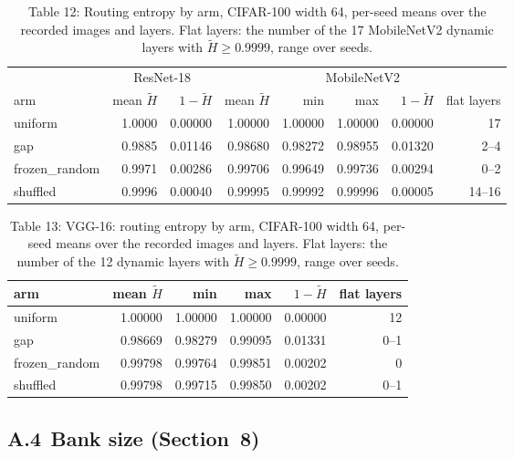 \documentclass{article}
\begin{document}
\begin{table}
\caption{Table 12: Routing entropy by arm, CIFAR-100 width 64, per-seed means over
the recorded images and layers. Flat layers: the number of the
17 MobileNetV2 dynamic layers with $\tilde H\ge0.9999$, range
over seeds.}

\begin{tabular}{l rr rrrr r}
\toprule
& \multicolumn{2}{c}{ResNet-18} & \multicolumn{5}{c}{MobileNetV2} \\

arm & mean $\tilde H$ & $1-\tilde H$ & mean $\tilde H$ & min & max & $1-\tilde H$ & flat layers \\
\midrule
uniform & 1.0000 & 0.00000 & 1.00000 & 1.00000 & 1.00000 & 0.00000 & 17 \\
gap & 0.9885 & 0.01146 & 0.98680 & 0.98272 & 0.98955 & 0.01320 & 2--4 \\
frozen\_random & 0.9971 & 0.00286 & 0.99706 & 0.99649 & 0.99736 & 0.00294 & 0--2 \\
shuffled & 0.9996 & 0.00040 & 0.99995 & 0.99992 & 0.99996 & 0.00005 & 14--16 \\
\bottomrule
\end{tabular}
\end{table}

\begin{table}
\caption{Table 13: VGG-16: routing entropy by arm, CIFAR-100 width 64, per-seed
means over the recorded images and layers. Flat layers: the number of the
12 dynamic layers with $\tilde H\ge0.9999$, range over seeds.}

\begin{tabular}{l rrrr r}
\toprule
arm & mean $\tilde H$ & min & max & $1-\tilde H$ & flat layers \\
\midrule
uniform & 1.00000 & 1.00000 & 1.00000 & 0.00000 & 12 \\
gap & 0.98669 & 0.98279 & 0.99095 & 0.01331 & 0--1 \\
frozen\_random & 0.99798 & 0.99764 & 0.99851 & 0.00202 & 0 \\
shuffled & 0.99798 & 0.99715 & 0.99850 & 0.00202 & 0--1 \\
\bottomrule
\end{tabular}
\end{table}



\subsection*{A.4 Bank size (Section~8)}
\end{document}
